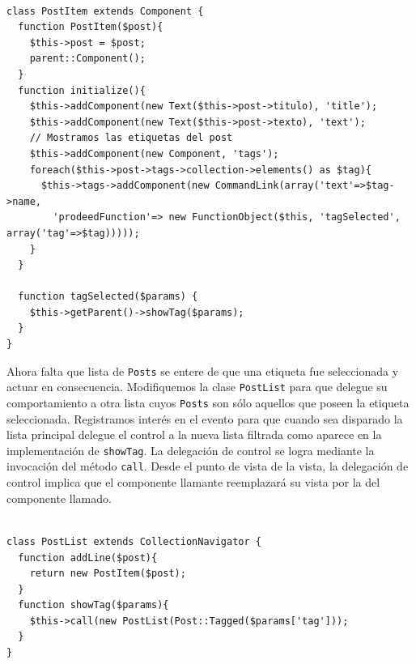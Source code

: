 \begin{verbatim}

class PostItem extends Component {
  function PostItem($post){
    $this->post = $post;
    parent::Component();
  }
  function initialize(){
    $this->addComponent(new Text($this->post->titulo), 'title');
    $this->addComponent(new Text($this->post->texto), 'text');
    // Mostramos las etiquetas del post
    $this->addComponent(new Component, 'tags');
    foreach($this->post->tags->collection->elements() as $tag){
      $this->tags->addComponent(new CommandLink(array('text'=>$tag->name,
        'prodeedFunction'=> new FunctionObject($this, 'tagSelected', array('tag'=>$tag)))));
    }
  }

  function tagSelected($params) {
    $this->getParent()->showTag($params);
  }
}

\end{verbatim}

Ahora falta que lista de \verb"Posts" se entere de que una etiqueta fue seleccionada y actuar en consecuencia. Modifiquemos la clase \verb"PostList" para que delegue su comportamiento a otra lista cuyos \verb"Posts" son sólo aquellos que poseen la etiqueta seleccionada. Registramos interés en el evento para que cuando sea disparado la lista principal delegue el control a la nueva lista filtrada como aparece en la implementación de \verb"showTag". La delegación de control se logra mediante la invocación del método \verb"call". Desde el punto de vista de la vista, la delegación de control implica que el componente llamante reemplazará su vista por la del componente llamado.

\begin{verbatim}

class PostList extends CollectionNavigator {
  function addLine($post){
    return new PostItem($post);
  }
  function showTag($params){
    $this->call(new PostList(Post::Tagged($params['tag']));
  }
}

\end{verbatim}






